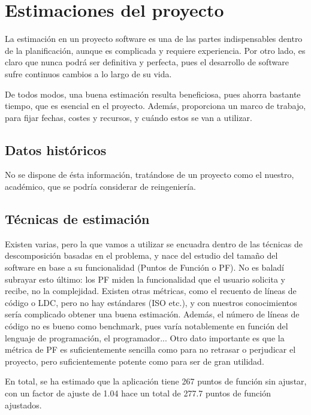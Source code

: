\documentclass[spanish,a4paper,12pt]{report}	%
\begin{document}
\newpage
\mbox{}
\thispagestyle{empty}						%
\newpage
\setcounter{section}{0}

\chapter{Estimaciones del proyecto}

		La estimación en un proyecto software es una de las partes indispensables dentro
		de la planificación, aunque es complicada y requiere experiencia. Por otro lado,
		es claro que nunca podrá ser definitiva y perfecta, pues el desarrollo de
		software sufre continuos cambios a lo largo de su vida.
		
		De todos modos, una buena estimación resulta beneficiosa, pues ahorra bastante
		tiempo, que es esencial en el proyecto. Además, proporciona un marco de trabajo,
		para fijar fechas, costes y recursos, y cuándo estos se van a utilizar.

	\section{Datos históricos}
		No se dispone de ésta información, tratándose de un proyecto como el nuestro,
		académico, que se podría considerar de reingeniería.

	\section{Técnicas de estimación}
		Existen varias, pero la que vamos a utilizar se encuadra dentro de las técnicas
		de descomposición basadas en el problema, y nace del estudio del tamaño del
		software en base a su funcionalidad (Puntos de Función o PF). No es baladí
		subrayar esto último: los PF miden la funcionalidad que el usuario solicita y
		recibe, no la complejidad. Existen otras métricas, como el recuento de líneas de
		código o LDC, pero no hay estándares (ISO etc.), y con nuestros conocimientos
		sería complicado obtener una buena estimación. Además, el número de líneas de
		código no es bueno como benchmark, pues varía notablemente en función del
		lenguaje de programación, el programador... Otro dato importante es que la
		métrica de PF es suficientemente sencilla como para no retrasar o perjudicar el
		proyecto, pero suficientemente potente como para ser de gran utilidad.

		En total, se ha estimado que la aplicación tiene 267 puntos de función sin ajustar, 
		con un factor de ajuste de 1.04 hace un total de 277.7 puntos de función ajustados.
\end{document}
